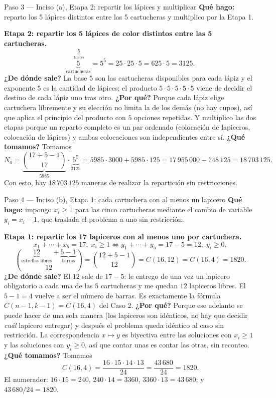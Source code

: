 \documentclass[11pt]{article}
\begin{document}
\begin{sol}
\begin{paso}{Paso 3 --- Inciso (a), Etapa 2: repartir los lápices y multiplicar}
\textbf{Qué hago:} reparto los 5 lápices distintos entre las 5 cartucheras y multiplico por la Etapa 1.

\medskip
\textbf{Etapa 2: repartir los 5 lápices de color distintos entre las 5 cartucheras.}
\[
\underbrace{5}_{\text{cartucheras}}^{\;\underbrace{5}_{\text{lápices}}}=5^5=25\cdot 25\cdot 5=625\cdot 5=3125 .
\]
\textbf{¿De dónde sale?} La base $5$ son las cartucheras disponibles para cada lápiz y el exponente $5$ es la cantidad de lápices; el producto $5\cdot5\cdot5\cdot5\cdot5$ viene de decidir el destino de cada lápiz uno tras otro.
\textbf{¿Por qué?} Porque cada lápiz elige cartuchera libremente y su elección no limita la de los demás (no hay cupos), así que aplica el principio del producto con $5$ opciones repetidas. Y multiplico las dos etapas porque un reparto completo es un par ordenado (colocación de lapiceros, colocación de lápices) y ambas colocaciones son independientes entre sí.
\textbf{¿Qué tomamos?} Tomamos
\[
N_a=\underbrace{\binom{17+5-1}{17}}_{5985}\cdot\underbrace{5^5}_{3125}=5985\cdot 3000+5985\cdot 125=17\,955\,000+748\,125=18\,703\,125 .
\]
Con esto, hay $18\,703\,125$ maneras de realizar la repartición sin restricciones.
\end{paso}

\begin{paso}{Paso 4 --- Inciso (b), Etapa 1: cada cartuchera con al menos un lapicero}
\textbf{Qué hago:} impongo $x_i\ge 1$ para las cinco cartucheras mediante el cambio de variable $y_i=x_i-1$, que traslada el problema a uno sin restricción.

\medskip
\textbf{Etapa 1: repartir los 17 lapiceros con al menos uno por cartuchera.}
\[
x_1+\cdots+x_5=17,\;x_i\ge1
\iff y_1+\cdots+y_5=17-5=12,\;y_i\ge 0,
\]
\[
\binom{\underbrace{12}_{\text{estrellas libres}}+\underbrace{5-1}_{\text{barras}}}{12}=\binom{12+5-1}{12}=C(16,12)=C(16,4)=1820 .
\]
\textbf{¿De dónde sale?} El $12$ sale de $17-5$: le entrego de una vez un lapicero obligatorio a cada una de las 5 cartucheras y me quedan $12$ lapiceros libres. El $5-1=4$ vuelve a ser el número de barras. Es exactamente la fórmula $C(n-1,k-1)=C(16,4)$ del Caso 2.
\textbf{¿Por qué?} Porque ese adelanto se puede hacer de una sola manera (los lapiceros son idénticos, no hay que decidir \emph{cuál} lapicero entregar) y después el problema queda idéntico al caso sin restricción. La correspondencia $x\mapsto y$ es biyectiva entre las soluciones con $x_i\ge1$ y las soluciones con $y_i\ge0$, así que contar unas es contar las otras, sin reconteo.
\textbf{¿Qué tomamos?} Tomamos
\[
C(16,4)=\frac{16\cdot 15\cdot 14\cdot 13}{24}=\frac{43\,680}{24}=1820 .
\]
El numerador: $16\cdot 15=240$, $240\cdot 14=3360$, $3360\cdot 13=43\,680$; y $43\,680/24=1820$.
\end{paso}


\end{sol}
\end{document}

